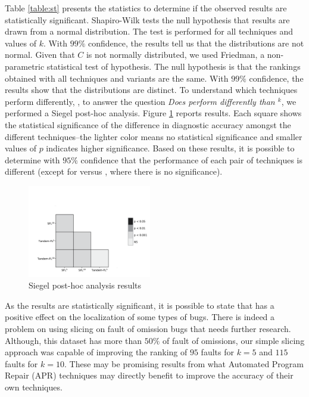\documentclass{article}
\begin{document}
Table \ref{table:st} presents the statistics to determine if the
observed results are statistically significant. Shapiro-Wilk tests the
null hypothesis that results are drawn from a normal distribution. The
test is performed for all techniques and values of $k$. With $99\%$
confidence, the results tell us that the distributions are not
normal. Given that $C$ is not normally distributed, we used Friedman, a
non-parametric statistical test of hypothesis. The null hypothesis is
that the rankings obtained with all techniques and variants are the
same. With $99\%$ confidence, the results show that the distributions
are distinct. To understand which techniques perform differently,
\ie{}, to answer the question \textit{Does  perform
  differently than \sfl{}$^{k}$}, we performed a Siegel post-hoc
analysis. Figure \ref{fig:performance} reports results. Each square
shows the statistical significance of the difference in diagnostic
accuracy amongst the different techniques--the lighter color means no
statistical significance and smaller values of $p$ indicates higher significance. 
Based on these results, it is possible to determine with $95\%$ confidence that the
performance of each pair of techniques is different (except for  
versus , where there is no significance).

\begin{figure}[h]
	\vspace{-2cm}
		\includegraphics[width=0.48\textwidth]{figures/heatmap_seg_result.png}
		\caption{Siegel post-hoc analysis results}
		\label{fig:performance}
		\vspace{-0.3cm}
\end{figure}

As the results are statistically significant, it is possible to state
that  has a positive effect on the localization of some
types of bugs. There is indeed a problem on using slicing on fault of
omission bugs that needs further research.  Although, this dataset has
more than $50\%$ of fault of omissions, our simple slicing approach
was capable of improving the ranking of $95$ faults for $k=5$ and
$115$ faults for $k=10$. These may be promising results from what Automated
Program Repair (APR) techniques may directly benefit to improve the accuracy
of their own techniques. 
\end{document}
